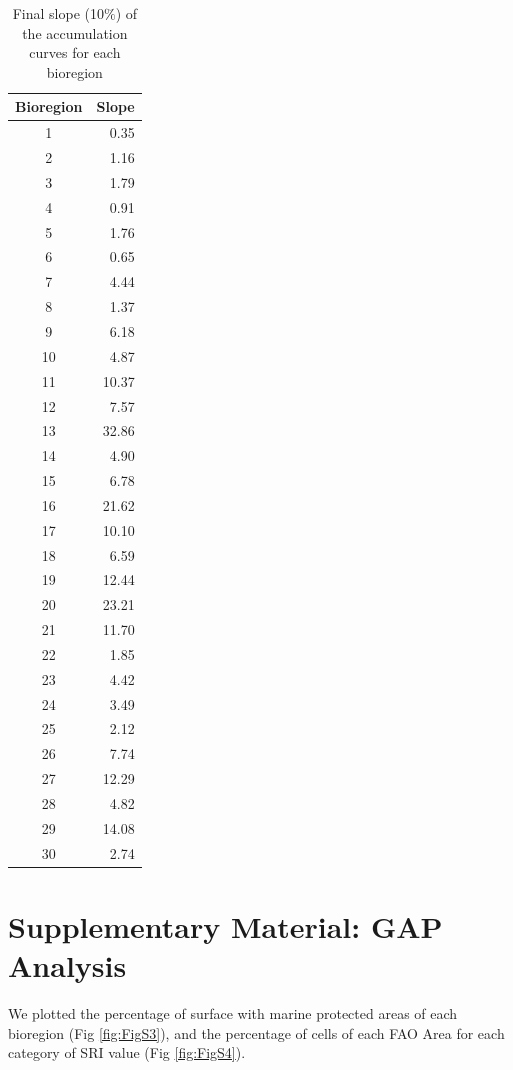 \documentclass[12pt,authoryear]{elsarticle}
\begin{document}
\begin{table}[h]
\centering
\begin{tabular}{| c | r |}
  \hline
\textbf{Bioregion} & \textbf{Slope} \\ 
  \hline
  \hline
1 & 0.35 \\ 
2 & 1.16 \\ 
3 & 1.79 \\ 
4 & 0.91 \\ 
5 & 1.76 \\ 
6 & 0.65 \\ 
7 & 4.44 \\ 
8 & 1.37 \\ 
9 & 6.18 \\ 
10 & 4.87 \\ 
11 & 10.37 \\ 
12 & 7.57 \\ 
13 & 32.86 \\ 
14 & 4.90 \\ 
15 & 6.78 \\ 
16 & 21.62 \\ 
17 & 10.10 \\ 
18 & 6.59 \\ 
19 & 12.44 \\ 
20 & 23.21 \\ 
21 & 11.70 \\ 
22 & 1.85 \\ 
23 & 4.42 \\ 
24 & 3.49 \\ 
25 & 2.12 \\ 
26 & 7.74 \\ 
27 & 12.29 \\ 
28 & 4.82 \\ 
29 & 14.08 \\ 
30 & 2.74 \\ 
  \hline
   \hline
\end{tabular}
\caption{Final slope (10$\%$) of the accumulation curves for each bioregion}
\label{tab:slope}
\end{table}

\section{Supplementary Material: GAP Analysis}
We plotted the percentage of surface with marine protected areas of each bioregion (Fig \ref{fig:FigS3}), and the percentage of cells of each FAO Area for each category of SRI value (Fig \ref{fig:FigS4}).
\end{document}
